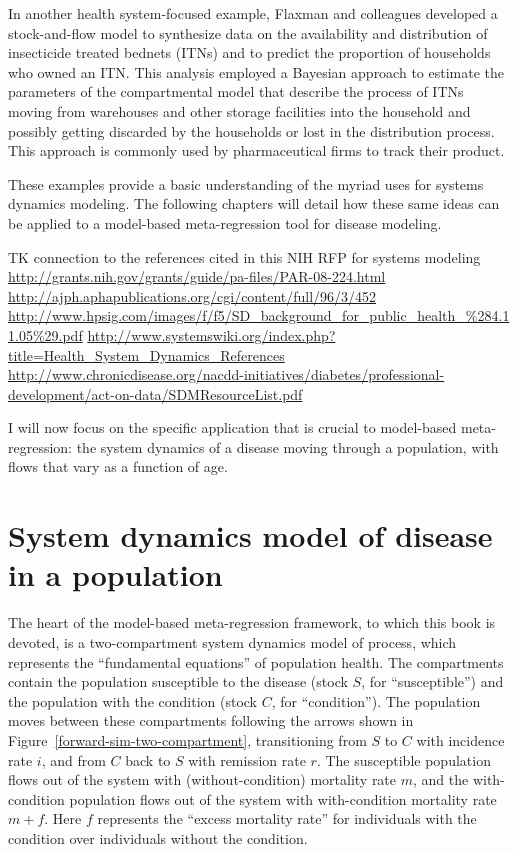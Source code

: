 In another health system-focused example, Flaxman and colleagues
developed a stock-and-flow model to synthesize data on the
availability and distribution of insecticide treated bednets (ITNs)
and to predict the proportion of households who owned an ITN. This
analysis employed a Bayesian approach to estimate the parameters of
the compartmental model that describe the process of ITNs moving from
warehouses and other storage facilities into the household and
possibly getting discarded by the households or lost in the
distribution process.  This approach is commonly used by
pharmaceutical firms to track their product.

These examples provide a basic understanding of the myriad uses for
systems dynamics modeling. The following chapters will detail how
these same ideas can be applied to a model-based meta-regression tool
for disease modeling.




TK connection to the references cited in this NIH RFP for systems modeling
\url{http://grants.nih.gov/grants/guide/pa-files/PAR-08-224.html}
\url{http://ajph.aphapublications.org/cgi/content/full/96/3/452}
\url{http://www.hpsig.com/images/f/f5/SD_background_for_public_health_%284.11.05%29.pdf}
\url{http://www.systemswiki.org/index.php?title=Health_System_Dynamics_References}
\url{http://www.chronicdisease.org/nacdd-initiatives/diabetes/professional-development/act-on-data/SDMResourceList.pdf}



I will now focus on the specific application that is crucial to
model-based meta-regression: the system dynamics of a disease moving
through a population, with flows that vary as a function of age.

\section{System dynamics model of disease in a population}

The heart of the model-based meta-regression framework, to which this
book is devoted, is a two-compartment system dynamics model of
process, which represents the ``fundamental equations'' of population
health. The compartments contain the population susceptible to the
disease (stock $S$, for ``susceptible'') and the population with the
condition (stock $C$, for ``condition''). The population moves between
these compartments following the arrows shown in
Figure~\ref{forward-sim-two-compartment}, transitioning from $S$ to
$C$ with incidence rate $i$, and from $C$ back to $S$ with remission
rate $r$. The susceptible population flows out of the system with
(without-condition) mortality rate $m$, and the with-condition
population flows out of the system with with-condition mortality rate
$m+f$.  Here $f$ represents the ``excess mortality rate'' for
individuals with the condition over individuals without the condition.

